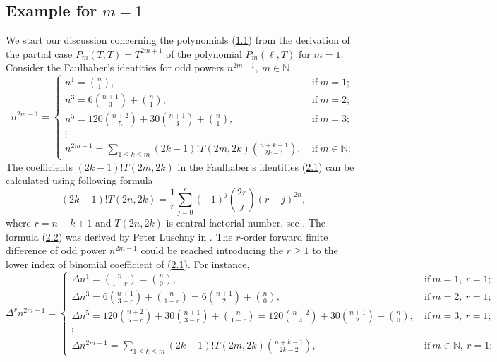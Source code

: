 \documentclass[11pt, letterpaper]{amsart} da da ya qq
\theoremstyle{definition}
\theoremstyle{remark}
\numberwithin{equation}{section}
\begin{document}
\subsection{Example for \texorpdfstring{$m=1$}{m=1}}
We start our discussion concerning the polynomials (\hyperref[f1]{1.1}) from the derivation of the partial case $P_m(T,T)=T^{2m+1}$ of the polynomial $P_m(\ell,T)$ for $m=1$. Consider the Faulhaber's identities \cite{1} for odd powers $n^{2m-1}, \ m\in\mathbb{N}$
\begin{equation}\label{knuth1}
n^{2m-1}=\begin{cases}
n^1 = \binom{n}{1}, \ &\mathrm{if} \ m=1;\\
n^3 = 6\binom{n+1}{3}+\binom{n}{1}, \ &\mathrm{if} \ m=2;\\
n^5 = 120\binom{n+2}{5}+30\binom{n+1}{3}+\binom{n}{1}, \ &\mathrm{if} \ m=3;\\
\vdots\\
n^{2m-1} = \sum\limits_{1\leq k\leq m}(2k-1)!T(2m,2k)\binom{n+k-1}{2k-1}, \ &\mathrm{if} \ m\in\mathbb{N};
\end{cases}
\end{equation}
The coefficients $(2k-1)!T(2m,2k)$ in the Faulhaber's identities (\hyperref[knuth1]{2.1}) can be calculated using following formula
\begin{equation}\label{knuth2}
(2k-1)!T(2n,2k)=\frac{1}{r}\sum_{j=0}^{r}(-1)^j\binom{2r}{j}(r-j)^{2n},
\end{equation}
where $r=n-k+1$ and $T(2n,2k)$ is central factorial number, see \cite{22}. The formula (\hyperref[knuth2]{2.2}) was derived by Peter Luschny in \cite{27}. The $r$-order forward finite difference of odd power $n^{2m-1}$ could be reached introducing the $r\geq 1$ to the lower index of binomial coefficient of (\hyperref[knuth1]{2.1}). For instance,
\begin{equation}\label{forward_diff_identity}
\Delta^r n^{2m-1}=
\begin{cases}
\Delta n^1 = \binom{n}{1-r}=\binom{n}{0}, \ &\mathrm{if} \ m=1, \ r=1;\\
\Delta n^3 = 6\binom{n+1}{3-r}+\binom{n}{1-r}=6\binom{n+1}{2}+\binom{n}{0}, \ &\mathrm{if} \ m=2, \ r=1;\\
\Delta n^5 = 120\binom{n+2}{5-r}+30\binom{n+1}{3-r}+\binom{n}{1-r}=120\binom{n+2}{4}+30\binom{n+1}{2}+\binom{n}{0}, \ &\mathrm{if} \ m=3, \ r=1;\\
\vdots\\
\Delta n^{2m-1} =\sum\limits_{1\leq k\leq m}(2k-1)!T(2m,2k)\binom{n+k-1}{2k-2}, \ &\mathrm{if} \ m\in\mathbb{N}, \ r=1;
\end{cases}
\end{equation}
\end{document}
